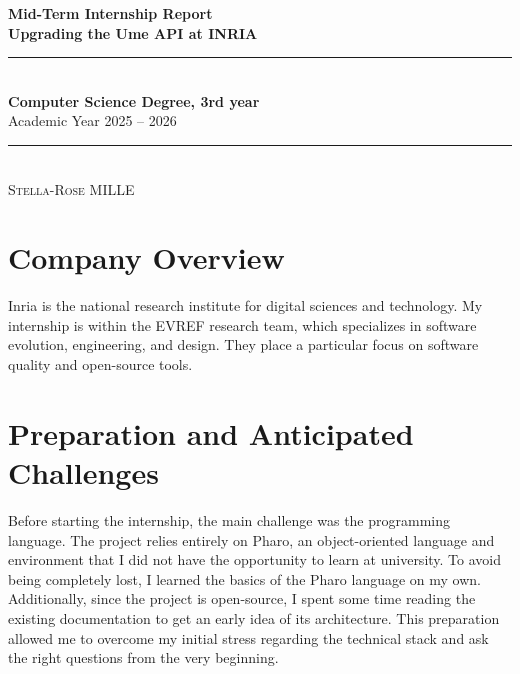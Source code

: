 \documentclass[12pt,a4paper]{report} %
\begin{document}

{\centering
    \vspace*{0.5cm}
    
    {\fontsize{20}{24}\selectfont\bfseries Mid-Term Internship Report}\\[0.4cm]
    {\fontsize{16}{20}\selectfont\bfseries Upgrading the Ume API at INRIA}\\[0.6cm]
    
    \rule{\textwidth}{1pt}\\[0.4cm]

    {\fontsize{14}{16}\selectfont\bfseries Computer Science Degree, 3rd year}\\[0.4cm]
    {\fontsize{12}{14}\selectfont Academic Year 2025 -- 2026}\\[0.5cm]
    
    \rule{\textwidth}{1pt}\\[0.4cm]
    
    {\fontsize{14}{16}\selectfont\scshape Stella-Rose MILLE}\\[1.5cm]
}


\chapter{Company Overview}
Inria is the national research institute for digital sciences and technology. 
My internship is within the EVREF research team, which specializes in software 
evolution, engineering, and design. They place a particular focus on software 
quality and open-source tools.

\chapter{Preparation and Anticipated Challenges}
Before starting the internship, the main challenge was the programming language. 
The project relies entirely on Pharo, an object-oriented language and environment 
that I did not have the opportunity to learn at university. 
To avoid being completely lost, I learned the basics of the Pharo language 
on my own. Additionally, since the project is open-source, I spent some time 
reading the existing documentation to get an early idea of its architecture. 
This preparation allowed me to overcome my initial stress regarding the 
technical stack and ask the right questions from the very beginning.
\end{document}
